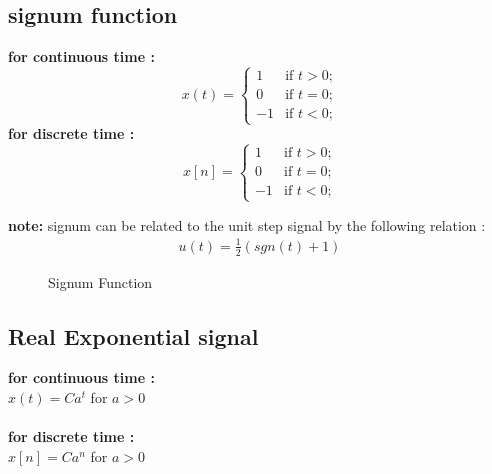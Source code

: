 \documentclass[a4paper,12pt]{book}
\begin{document}
\subsection*{ signum function}
{\bf for continuous time :}\\
	\[ x(t) = \left\{ \begin{array}{ll}

	1 & \mbox{if $t > 0$;} \\

	0 & \mbox{if $t = 0$;} \\
	-1 & \mbox{if $t < 0$;}
	\end{array}
	\right. \]
\bigskip
{\bf for discrete time :}\\
	\[ x[n] = \left\{ \begin{array}{ll}

	1 & \mbox{if $t > 0$;} \\

	0 & \mbox{if $t = 0$;} \\
	-1 & \mbox{if $t < 0$;}

	\end{array}
	\right. \]

{\bf note:} signum can be related to the unit step signal by the following relation :
\begin{align*}
u(t) = \frac{1}{2}(sgn(t)+1)
\end{align*}

\begin{figure}[h]  
\centering 
{}\hspace{6mm}
\caption{Signum Function} \label{fig:M}  
\end{figure}

\subsection*{ Real Exponential signal}
{\bf for continuous time :}\smallskip\\
	 $x(t) = Ca^t$ \hspace{4mm} for $a>0$\\
\bigskip\\
{\bf for discrete time :}\smallskip\\
	$x[n] = Ca^n$\hspace{4mm} for $a>0$\\
\end{document}
